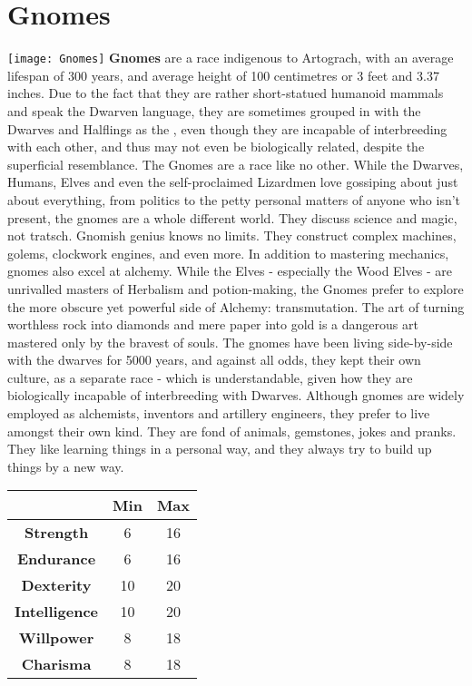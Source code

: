 \documentclass[openany,10pt,a4paper]{book}
\begin{document}
\section{Gnomes}
\texttt{[image: Gnomes]}\newline
\textbf{Gnomes} are a race indigenous to Artograch, with an average lifespan of 300 years, and average height of 100 centimetres or 3 feet and 3.37 inches. Due to the fact that they are rather short-statued humanoid mammals and speak the Dwarven language, they are sometimes grouped in with the Dwarves and Halflings as the , even though they are incapable of interbreeding with each other, and thus may not even be biologically related, despite the superficial resemblance.\newline
The Gnomes are a race like no other. While the Dwarves, Humans, Elves and even the self-proclaimed  Lizardmen love gossiping about just about everything, from politics to the petty personal matters of anyone who isn’t present, the gnomes are a whole different world. They discuss science and magic, not tratsch. Gnomish genius knows no limits. They construct complex machines, golems, clockwork engines, and even more. In addition to mastering mechanics, gnomes also excel at alchemy. While the Elves - especially the Wood Elves - are unrivalled masters of Herbalism and potion-making, the Gnomes prefer to explore the more obscure yet powerful side of Alchemy: transmutation. The art of turning worthless rock into diamonds and mere paper into gold is a dangerous art mastered only by the bravest of souls.\newline
The gnomes have been living side-by-side with the dwarves for 5000 years, and against all odds, they kept their own culture, as a separate race - which is understandable, given how they are biologically incapable of interbreeding with Dwarves. Although gnomes are widely employed as alchemists, inventors and artillery engineers, they prefer to live amongst their own kind. They are fond of animals, gemstones, jokes and pranks. They like learning things in a personal way, and they always try to build up things by a new way.\newline
\begin{tabular}{|c|c|c|}
\hline
 & \textbf{Min} & \textbf{Max} \\ \hline
\textbf{Strength} & 6 & 16 \\ \hline
\textbf{Endurance} & 6 & 16 \\ \hline
\textbf{Dexterity} & 10 & 20 \\ \hline
\textbf{Intelligence} & 10 & 20 \\ \hline
\textbf{Willpower} & 8 & 18 \\ \hline
\textbf{Charisma} & 8 & 18 \\ \hline
\end{tabular}\newline
{} \newpage
\end{document}
